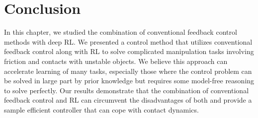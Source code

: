 \section{Conclusion}\label{sec:discussion}

In this chapter, we studied the combination of conventional feedback control methods with deep RL. 
We presented a control method that utilizes conventional feedback control along with RL to solve complicated manipulation tasks involving friction and contacts with unstable objects. 
We believe this approach can accelerate learning of many tasks, especially those where the control problem can be solved in large part by prior knowledge but requires some model-free reasoning to solve perfectly.
Our results demonstrate that the combination of conventional feedback control and RL can circumvent the disadvantages of both and provide a sample efficient controller that can cope with contact dynamics.



